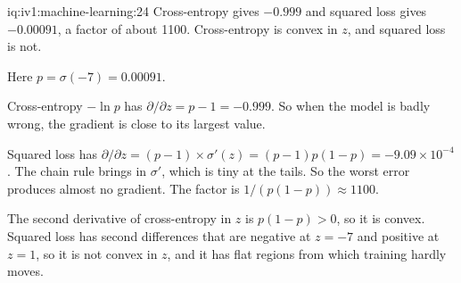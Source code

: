 \begin{solution}{iq:iv1:machine-learning:24}
Cross-entropy gives $-0.999$ and squared loss gives $-0.00091$, a factor of about 1100. Cross-entropy is convex in $z$, and squared loss is not.

Here $p = \sigma(-7) = 0.00091$.

Cross-entropy $-\ln p$ has $\partial/\partial z = p - 1 = -0.999$. So when the model is badly wrong, the gradient is close to its largest value.

Squared loss has $\partial/\partial z = (p - 1) \times \sigma'(z) = (p - 1)p(1 - p) = -9.09 \times 10^{-4}$. The chain rule brings in $\sigma'$, which is tiny at the tails. So the worst error produces almost no gradient. The factor is $1/(p(1 - p)) \approx 1100$.

The second derivative of cross-entropy in $z$ is $p(1 - p) > 0$, so it is convex. Squared loss has second differences that are negative at $z = -7$ and positive at $z = 1$, so it is not convex in $z$, and it has flat regions from which training hardly moves.



\end{solution}

